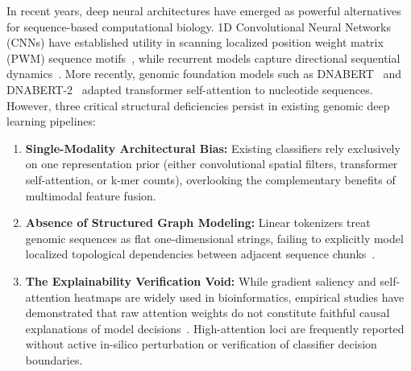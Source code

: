 \documentclass[conference]{IEEEtran}
\begin{document}
In recent years, deep neural architectures have emerged as powerful alternatives for sequence-based computational biology. 1D Convolutional Neural Networks (CNNs) have established utility in scanning localized position weight matrix (PWM) sequence motifs~\cite{alipanahi2015,zhou2015}, while recurrent models capture directional sequential dynamics~\cite{shen2018}. More recently, genomic foundation models such as DNABERT~\cite{ji2021} and DNABERT-2~\cite{zhou2024_dnabert2} adapted transformer self-attention to nucleotide sequences. However, three critical structural deficiencies persist in existing genomic deep learning pipelines:
\begin{enumerate}
    \item \textbf{Single-Modality Architectural Bias:} Existing classifiers rely exclusively on one representation prior (either convolutional spatial filters, transformer self-attention, or k-mer counts), overlooking the complementary benefits of multimodal feature fusion.
    \item \textbf{Absence of Structured Graph Modeling:} Linear tokenizers treat genomic sequences as flat one-dimensional strings, failing to explicitly model localized topological dependencies between adjacent sequence chunks~\cite{velickovic2018}.
    \item \textbf{The Explainability Verification Void:} While gradient saliency and self-attention heatmaps are widely used in bioinformatics, empirical studies have demonstrated that raw attention weights do not constitute faithful causal explanations of model decisions~\cite{jain2019,wiegreffe2019}. High-attention loci are frequently reported without active in-silico perturbation or verification of classifier decision boundaries.
\end{enumerate}
\end{document}

